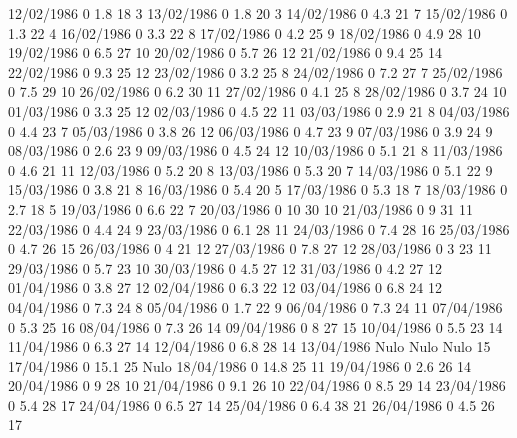 12/02/1986  0      1.8    18     3 
13/02/1986  0      1.8    20     3 
14/02/1986  0      4.3    21     7 
15/02/1986  0      1.3    22     4 
16/02/1986  0      3.3    22     8 
17/02/1986  0      4.2    25     9 
18/02/1986  0      4.9    28     10 
19/02/1986  0      6.5    27     10 
20/02/1986  0      5.7    26     12 
21/02/1986  0      9.4    25     14 
22/02/1986  0      9.3    25     12 
23/02/1986  0      3.2    25     8 
24/02/1986  0      7.2    27     7 
25/02/1986  0      7.5    29     10 
26/02/1986  0      6.2    30     11 
27/02/1986  0      4.1    25     8 
28/02/1986  0      3.7    24     10 
01/03/1986  0      3.3    25     12 
02/03/1986  0      4.5    22     11 
03/03/1986  0      2.9    21     8 
04/03/1986  0      4.4    23     7 
05/03/1986  0      3.8    26     12 
06/03/1986  0      4.7    23     9 
07/03/1986  0      3.9    24     9 
08/03/1986  0      2.6    23     9 
09/03/1986  0      4.5    24     12 
10/03/1986  0      5.1    21     8 
11/03/1986  0      4.6    21     11 
12/03/1986  0      5.2    20     8 
13/03/1986  0      5.3    20     7 
14/03/1986  0      5.1    22     9 
15/03/1986  0      3.8    21     8 
16/03/1986  0      5.4    20     5 
17/03/1986  0      5.3    18     7 
18/03/1986  0      2.7    18     5 
19/03/1986  0      6.6    22     7 
20/03/1986  0      10     30     10 
21/03/1986  0      9      31     11 
22/03/1986  0      4.4    24     9 
23/03/1986  0      6.1    28     11 
24/03/1986  0      7.4    28     16 
25/03/1986  0      4.7    26     15 
26/03/1986  0      4      21     12 
27/03/1986  0      7.8    27     12 
28/03/1986  0      3      23     11 
29/03/1986  0      5.7    23     10 
30/03/1986  0      4.5    27     12 
31/03/1986  0      4.2    27     12 
01/04/1986  0      3.8    27     12 
02/04/1986  0      6.3    22     12 
03/04/1986  0      6.8    24     12 
04/04/1986  0      7.3    24     8 
05/04/1986  0      1.7    22     9 
06/04/1986  0      7.3    24     11 
07/04/1986  0      5.3    25     16 
08/04/1986  0      7.3    26     14 
09/04/1986  0      8      27     15 
10/04/1986  0      5.5    23     14 
11/04/1986  0      6.3    27     14 
12/04/1986  0      6.8    28     14 
13/04/1986 Nulo   Nulo   Nulo    15 
17/04/1986  0      15.1   25    Nulo
18/04/1986  0      14.8   25     11 
19/04/1986  0      2.6    26     14 
20/04/1986  0      9      28     10 
21/04/1986  0      9.1    26     10 
22/04/1986  0      8.5    29     14 
23/04/1986  0      5.4    28     17 
24/04/1986  0      6.5    27     14 
25/04/1986  0      6.4    38     21 
26/04/1986  0      4.5    26     17 
